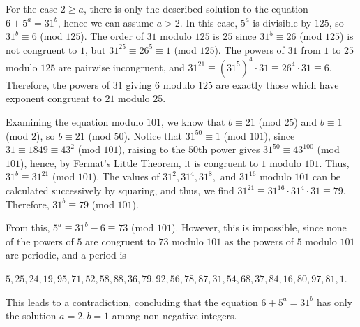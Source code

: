 \documentclass{article}
\begin{document}
For the case \(\displaystyle 2\geq{a}\), there is only the described solution to the equation \(\displaystyle 6+5^a=31^b\), hence we can assume \(\displaystyle a>2\). In this case, \(\displaystyle 5^a\) is divisible by \(\displaystyle 125\), so \(\displaystyle 31^b\equiv6\) (mod \(\displaystyle 125\)). The order of \(\displaystyle 31\) modulo \(\displaystyle 125\) is \(\displaystyle 25\) since \(\displaystyle 31^5\equiv26\) (mod \(\displaystyle 125\)) is not congruent to \(\displaystyle 1\), but \(\displaystyle 31^{25}\equiv26^5\equiv 1\) (mod \(\displaystyle 125\)). The powers of \(\displaystyle 31\) from \(\displaystyle 1\) to \(\displaystyle 25\) modulo \(\displaystyle 125\) are pairwise incongruent, and \(\displaystyle 31^{21}\equiv(31^5)^4\cdot31\equiv26^4\cdot31\equiv 6\). Therefore, the powers of \(\displaystyle 31\) giving \(\displaystyle 6\) modulo \(\displaystyle 125\) are exactly those which have exponent congruent to \(\displaystyle 21\) modulo 25.

Examining the equation modulo \(\displaystyle 101\), we know that \(\displaystyle b\equiv21\) (mod \(\displaystyle 25\)) and \(\displaystyle b\equiv1\) (mod \(\displaystyle 2\)), so \(\displaystyle b\equiv21\) (mod \(\displaystyle 50\)). Notice that \(\displaystyle 31^{50}\equiv1\) (mod \(\displaystyle 101\)), since \(\displaystyle 31\equiv1849\equiv43^2\) (mod \(\displaystyle 101\)), raising to the \(\displaystyle 50\)th power gives \(\displaystyle 31^{50}\equiv43^{100}\) (mod \(\displaystyle 101\)), hence, by Fermat's Little Theorem, it is congruent to \(\displaystyle 1\) modulo \(\displaystyle 101\). Thus, \(\displaystyle 31^b\equiv31^{21}\) (mod \(\displaystyle 101\)). The values of \(\displaystyle 31^2, 31^4, 31^8,\) and \(\displaystyle 31^{16}\) modulo \(\displaystyle 101\) can be calculated successively by squaring, and thus, we find \(\displaystyle 31^{21}\equiv 31^{16}\cdot 31^4\cdot31\equiv 79\). Therefore, \(\displaystyle 31^b\equiv79\) (mod \(\displaystyle 101\)).

From this, \(\displaystyle 5^a\equiv31^b-6\equiv73\) (mod \(\displaystyle 101\)). However, this is impossible, since none of the powers of \(\displaystyle 5\) are congruent to \(\displaystyle 73\) modulo \(\displaystyle 101\) as the powers of \(\displaystyle 5\) modulo \(\displaystyle 101\) are periodic, and a period is

\(\displaystyle 5,25,24,19,95,71,52,58,88,36,79,92,56,78,87,31,54,68,37,84,16,80,97,81,1.\)

This leads to a contradiction, concluding that the equation \(\displaystyle 6+5^a=31^b\) has only the solution \(\displaystyle a=2, b=1\) among non-negative integers.
\end{document}
